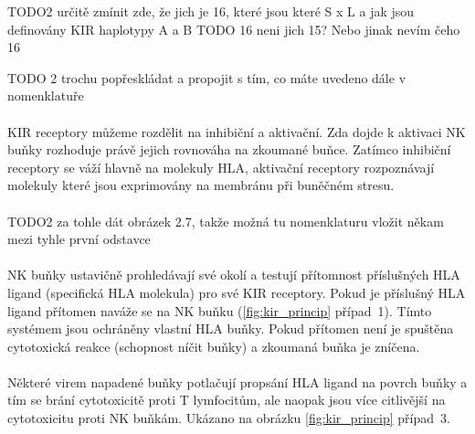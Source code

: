 \documentclass[czech,DP]{thesiskiv}
\begin{document}
TODO2 určitě zmínit zde, že jich je 16, které jsou které S x L a jak jsou definovány KIR haplotypy A a B
TODO 16 neni jich 15? Nebo jinak nevím čeho 16

TODO 2 trochu popřeskládat a propojit s tím, co máte uvedeno dále v nomenklatuře
\\
\\
KIR receptory můžeme rozdělit na inhibiční a aktivační. Zda dojde k aktivaci NK buňky rozhoduje právě jejich rovnováha na zkoumané buňce. Zatímco inhibiční receptory se váží hlavně na molekuly HLA, aktivační receptory rozpoznávají molekuly které jsou exprimovány na membránu při buněčném stresu.
\\
\\
TODO2 za tohle dát obrázek 2.7, takže možná tu nomenklaturu vložit někam mezi tyhle první odstavce
\\
\\
NK buňky ustavičně prohledávají své okolí a testují přítomnost příslušných HLA ligand (specifická HLA molekula) pro své KIR receptory. Pokud je příslušný HLA ligand přítomen naváže se na NK buňku (\ref{fig:kir_princip} případ~1). Tímto systémem jsou ochráněny vlastní HLA buňky. Pokud přítomen není je spuštěna cytotoxická reakce (schopnost níčit buňky) a zkoumaná buňka je zníčena.
\\
\\
Některé virem napadené buňky potlačují propsání HLA ligand na povrch buňky a tím se brání cytotoxicitě proti T lymfocitům, ale naopak jsou více citlivější na cytotoxicitu proti NK buňkám. Ukázano na obrázku \ref{fig:kir_princip} případ~3.
\end{document}
